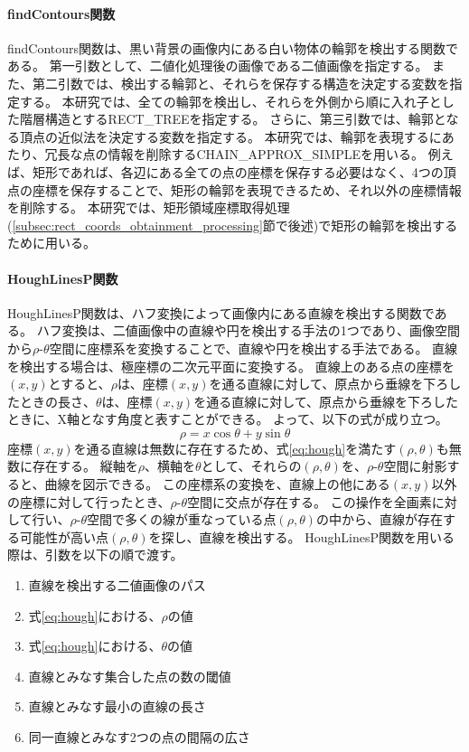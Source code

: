 \paragraph{findContours関数}
findContours関数は、黒い背景の画像内にある白い物体の輪郭を検出する関数である。
第一引数として、二値化処理後の画像である二値画像を指定する。
また、第二引数では、検出する輪郭と、それらを保存する構造を決定する変数を指定する。
本研究では、全ての輪郭を検出し、それらを外側から順に入れ子とした階層構造とするRECT\_TREEを指定する。
さらに、第三引数では、輪郭となる頂点の近似法を決定する変数を指定する。
本研究では、輪郭を表現するにあたり、冗長な点の情報を削除するCHAIN\_APPROX\_SIMPLEを用いる。
例えば、矩形であれば、各辺にある全ての点の座標を保存する必要はなく、4つの頂点の座標を保存することで、矩形の輪郭を表現できるため、それ以外の座標情報を削除する\cite{輪郭検出}。
本研究では、矩形領域座標取得処理(\ref{subsec:rect_coords_obtainment_processing}節で後述)で矩形の輪郭を検出するために用いる。

\paragraph{HoughLinesP関数}
HoughLinesP関数は、ハフ変換によって画像内にある直線を検出する関数である\cite{ハフ変換}。
ハフ変換は、二値画像中の直線や円を検出する手法の1つであり、画像空間から$\rho$-$\theta$空間に座標系を変換することで、直線や円を検出する手法である。
直線を検出する場合は、極座標の二次元平面に変換する。
直線上のある点の座標を$(x, y)$とすると、$\rho$は、座標$(x, y)$を通る直線に対して、原点から垂線を下ろしたときの長さ、$\theta$は、座標$(x, y)$を通る直線に対して、原点から垂線を下ろしたときに、X軸となす角度と表すことができる。
よって、以下の式が成り立つ。
\begin{equation}\label{eq:hough}
	\rho = x\cos\theta + y\sin\theta
\end{equation}
座標$(x, y)$を通る直線は無数に存在するため、式\ref{eq:hough}を満たす$(\rho, \theta)$も無数に存在する。
縦軸を$\rho$、横軸を$\theta$として、それらの$(\rho, \theta)$を、$\rho$-$\theta$空間に射影すると、曲線を図示できる。
この座標系の変換を、直線上の他にある$(x, y)$以外の座標に対して行ったとき、$\rho$-$\theta$空間に交点が存在する。
この操作を全画素に対して行い、$\rho$-$\theta$空間で多くの線が重なっている点$(\rho, \theta)$の中から、直線が存在する可能性が高い点$(\rho, \theta)$を探し、直線を検出する。
HoughLinesP関数を用いる際は、引数を以下の順で渡す\cite{HoughLinesP関数の引数}。

\begin{enumerate}
	\item 直線を検出する二値画像のパス
	\item 式\ref{eq:hough}における、$\rho$の値
	\item 式\ref{eq:hough}における、$\theta$の値
	\item 直線とみなす集合した点の数の閾値
	\item 直線とみなす最小の直線の長さ
	\item 同一直線とみなす2つの点の間隔の広さ
\end{enumerate}

